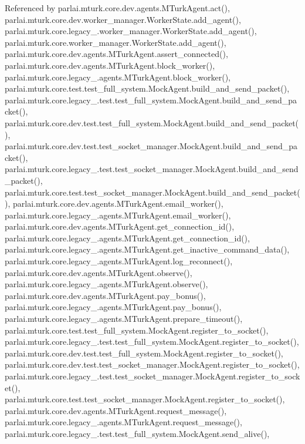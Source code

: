 Referenced by parlai.\+mturk.\+core.\+dev.\+agents.\+M\+Turk\+Agent.\+act(), parlai.\+mturk.\+core.\+dev.\+worker\+\_\+manager.\+Worker\+State.\+add\+\_\+agent(), parlai.\+mturk.\+core.\+legacy\+\_.\+worker\+\_\+manager.\+Worker\+State.\+add\+\_\+agent(), parlai.\+mturk.\+core.\+worker\+\_\+manager.\+Worker\+State.\+add\+\_\+agent(), parlai.\+mturk.\+core.\+dev.\+agents.\+M\+Turk\+Agent.\+assert\+\_\+connected(), parlai.\+mturk.\+core.\+dev.\+agents.\+M\+Turk\+Agent.\+block\+\_\+worker(), parlai.\+mturk.\+core.\+legacy\+\_.\+agents.\+M\+Turk\+Agent.\+block\+\_\+worker(), parlai.\+mturk.\+core.\+test.\+test\+\_\+full\+\_\+system.\+Mock\+Agent.\+build\+\_\+and\+\_\+send\+\_\+packet(), parlai.\+mturk.\+core.\+legacy\+\_.\+test.\+test\+\_\+full\+\_\+system.\+Mock\+Agent.\+build\+\_\+and\+\_\+send\+\_\+packet(), parlai.\+mturk.\+core.\+dev.\+test.\+test\+\_\+full\+\_\+system.\+Mock\+Agent.\+build\+\_\+and\+\_\+send\+\_\+packet(), parlai.\+mturk.\+core.\+dev.\+test.\+test\+\_\+socket\+\_\+manager.\+Mock\+Agent.\+build\+\_\+and\+\_\+send\+\_\+packet(), parlai.\+mturk.\+core.\+legacy\+\_.\+test.\+test\+\_\+socket\+\_\+manager.\+Mock\+Agent.\+build\+\_\+and\+\_\+send\+\_\+packet(), parlai.\+mturk.\+core.\+test.\+test\+\_\+socket\+\_\+manager.\+Mock\+Agent.\+build\+\_\+and\+\_\+send\+\_\+packet(), parlai.\+mturk.\+core.\+dev.\+agents.\+M\+Turk\+Agent.\+email\+\_\+worker(), parlai.\+mturk.\+core.\+legacy\+\_.\+agents.\+M\+Turk\+Agent.\+email\+\_\+worker(), parlai.\+mturk.\+core.\+dev.\+agents.\+M\+Turk\+Agent.\+get\+\_\+connection\+\_\+id(), parlai.\+mturk.\+core.\+legacy\+\_.\+agents.\+M\+Turk\+Agent.\+get\+\_\+connection\+\_\+id(), parlai.\+mturk.\+core.\+legacy\+\_.\+agents.\+M\+Turk\+Agent.\+get\+\_\+inactive\+\_\+command\+\_\+data(), parlai.\+mturk.\+core.\+legacy\+\_.\+agents.\+M\+Turk\+Agent.\+log\+\_\+reconnect(), parlai.\+mturk.\+core.\+dev.\+agents.\+M\+Turk\+Agent.\+observe(), parlai.\+mturk.\+core.\+legacy\+\_.\+agents.\+M\+Turk\+Agent.\+observe(), parlai.\+mturk.\+core.\+dev.\+agents.\+M\+Turk\+Agent.\+pay\+\_\+bonus(), parlai.\+mturk.\+core.\+legacy\+\_.\+agents.\+M\+Turk\+Agent.\+pay\+\_\+bonus(), parlai.\+mturk.\+core.\+legacy\+\_.\+agents.\+M\+Turk\+Agent.\+prepare\+\_\+timeout(), parlai.\+mturk.\+core.\+test.\+test\+\_\+full\+\_\+system.\+Mock\+Agent.\+register\+\_\+to\+\_\+socket(), parlai.\+mturk.\+core.\+legacy\+\_.\+test.\+test\+\_\+full\+\_\+system.\+Mock\+Agent.\+register\+\_\+to\+\_\+socket(), parlai.\+mturk.\+core.\+dev.\+test.\+test\+\_\+full\+\_\+system.\+Mock\+Agent.\+register\+\_\+to\+\_\+socket(), parlai.\+mturk.\+core.\+dev.\+test.\+test\+\_\+socket\+\_\+manager.\+Mock\+Agent.\+register\+\_\+to\+\_\+socket(), parlai.\+mturk.\+core.\+legacy\+\_.\+test.\+test\+\_\+socket\+\_\+manager.\+Mock\+Agent.\+register\+\_\+to\+\_\+socket(), parlai.\+mturk.\+core.\+test.\+test\+\_\+socket\+\_\+manager.\+Mock\+Agent.\+register\+\_\+to\+\_\+socket(), parlai.\+mturk.\+core.\+dev.\+agents.\+M\+Turk\+Agent.\+request\+\_\+message(), parlai.\+mturk.\+core.\+legacy\+\_.\+agents.\+M\+Turk\+Agent.\+request\+\_\+message(), parlai.\+mturk.\+core.\+legacy\+\_.\+test.\+test\+\_\+full\+\_\+system.\+Mock\+Agent.\+send\+\_\+alive(), 